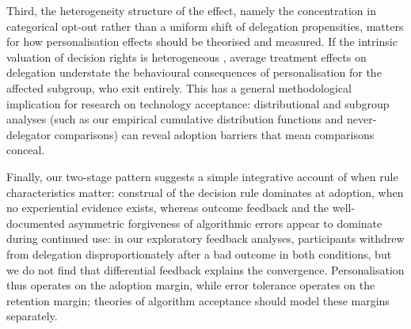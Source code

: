 \documentclass[a4paper, 12pt, fleqn]{article}
\theoremstyle{hypstyle}
\begin{document}
Third, the heterogeneity structure of the effect, namely the concentration in categorical opt-out rather than a uniform shift of delegation propensities, matters for how personalisation effects should be theorised and measured. If the intrinsic valuation of decision rights is heterogeneous \citep{Bartling2014,Owens2014}, average treatment effects on delegation understate the behavioural consequences of personalisation for the affected subgroup, who exit entirely. This has a general methodological implication for research on technology acceptance: distributional and subgroup analyses (such as our empirical cumulative distribution functions and never-delegator comparisons) can reveal adoption barriers that mean comparisons conceal.

Finally, our two-stage pattern suggests a simple integrative account of when rule characteristics matter: construal of the decision rule dominates at adoption, when no experiential evidence exists, whereas outcome feedback and the well-documented asymmetric forgiveness of algorithmic errors \citep{Dietvorst2015,Renier2021} appear to dominate during continued use: in our exploratory feedback analyses, participants withdrew from delegation disproportionately after a bad outcome in both conditions, but we do not find that differential feedback explains the convergence. Personalisation thus operates on the adoption margin, while error tolerance operates on the retention margin; theories of algorithm acceptance should model these margins separately.
\end{document}
